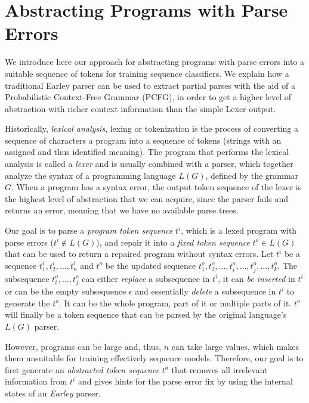 \section{Abstracting Programs with Parse Errors}
\label{sec:prog-abstract}

We introduce here our approach for abstracting programs with parse errors into a
suitable sequence of tokens for training sequence classifiers. We explain how a
traditional Earley parser can be used to extract partial parses with the aid of
a Probabilistic Context-Free Grammar (PCFG), in order to get a higher level of
abstraction with richer context information than the simple Lexer output.



Historically, \emph{lexical analysis}, lexing or tokenization is the process of
converting a sequence of characters \ie a program into a sequence of tokens
(strings with an assigned and thus identified meaning). The program that
performs the lexical analysis is called a \emph{lexer} and is usually combined
with a parser, which together analyze the syntax of a programming language
$L(G)$, defined by the grammar $G$. When a program has a syntax error, the
output token sequence of the lexer is the highest level of abstraction that we
can acquire, since the parser fails and returns an error, meaning that we have
no available parse trees.

Our goal is to parse a \emph{program token sequence} $t^i$, which is a lexed
program with parse errors (\ie $t^i \notin L(G)$), and repair it into a
\emph{fixed token sequence} $t^o \in L(G)$ that can be used to return a repaired
program without syntax errors. Let $t^i$ be a sequence $t^i_1, t^i_2, \dots,
t^i_n$ and $t^o$ be the updated sequence $t^o_1, t^o_2, \dots, t^o_i, \dots,
t^o_j, \dots, t^o_k$. The subsequence $t^o_i, \dots, t^o_j$ can either
\emph{replace} a subsequence in $t^i$, it can \emph{be inserted} in $t^i$ or can
be the empty subsequence $\epsilon$ and essentially \emph{delete} a subsequence
in $t^i$ to generate the $t^o$. It can be the whole program, part of it or
multiple parts of it. $t^o$ will finally be a token sequence that can be parsed
by the original language's $L(G)$ parser.

However, programs can be large and, thus, $n$ can take large values, which makes
them unsuitable for training effectively sequence models. Therefore, our goal is
to first generate an \emph{abstracted token sequence} $t^a$ that removes all
irrelevant information from $t^i$ and gives hints for the parse error fix by
using the internal states of an \emph{Earley} parser.


